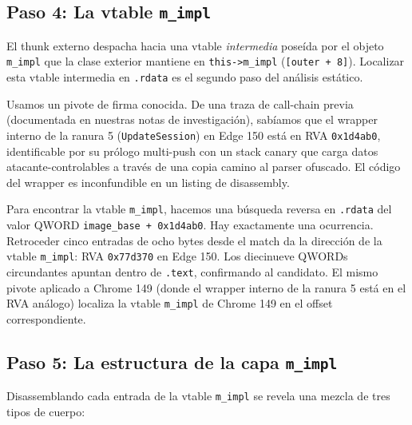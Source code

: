 \documentclass[11pt,letterpaper]{article}
\begin{document}
\subsection{Paso 4: La vtable \texttt{m\_impl}}
\label{sec:static-mimpl}

El thunk externo despacha hacia una vtable \emph{intermedia}
poseída por el objeto \texttt{m\_impl} que la clase exterior
mantiene en \texttt{this->m\_impl} (\texttt{[outer + 8]}).
Localizar esta vtable intermedia en \texttt{.rdata} es el segundo
paso del análisis estático.

Usamos un pivote de firma conocida. De una traza de call-chain
previa (documentada en nuestras notas de investigación), sabíamos
que el wrapper interno de la ranura 5 (\texttt{UpdateSession}) en
Edge 150 está en RVA \texttt{0x1d4ab0}, identificable por su
prólogo multi-push con un stack canary que carga datos
atacante-controlables a través de una copia camino al parser
ofuscado. El código del wrapper es inconfundible en un listing de
disassembly.

Para encontrar la vtable \texttt{m\_impl}, hacemos una búsqueda
reversa en \texttt{.rdata} del valor QWORD
\texttt{image\_base + 0x1d4ab0}. Hay
exactamente una ocurrencia. Retroceder cinco entradas de ocho
bytes desde el match da la dirección de la vtable
\texttt{m\_impl}: RVA \texttt{0x77d370} en Edge 150. Los
diecinueve QWORDs circundantes apuntan dentro de \texttt{.text},
confirmando al candidato. El mismo pivote aplicado a Chrome 149
(donde el wrapper interno de la ranura 5 está en el RVA análogo)
localiza la vtable \texttt{m\_impl} de Chrome 149 en el offset
correspondiente.

\subsection{Paso 5: La estructura de la capa \texttt{m\_impl}}
\label{sec:static-layer2}

Disassemblando cada entrada de la vtable \texttt{m\_impl} se
revela una mezcla de tres tipos de cuerpo:
\end{document}
